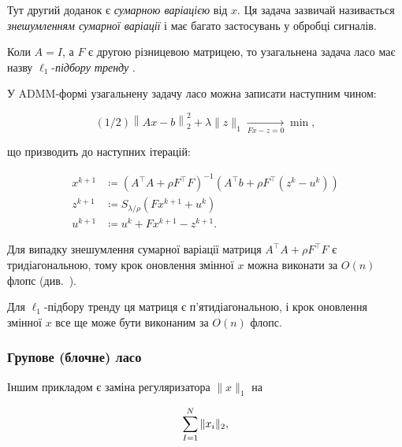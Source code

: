 \begin{definition}
    Тут другий доданок є \textit{сумарною варіацією} від $x$. Ця задача зазвичай називається \textit{знешумленням сумарної варіації} \cite{145} і має багато застосувань у обробці сигналів. 
\end{definition}

\begin{definition}
    Коли $A = I$, а $F$ є другою різницевою матрицею, то узагальнена задача ласо має назву $\ell_1$-\textit{підбору тренду} \cite{101}.
\end{definition}

У ADMM-формі узагальнену задачу ласо можна записати наступним чином:

\begin{equation}
    (1/2) \left\| A x - b \right\|_2^2 + \lambda \|z\|_1 \xrightarrow[F x - z = 0]{} \min,
\end{equation}

що призводить до наступних ітерацій:

\begin{align}
    x^{k + 1} &\coloneqq \left( A^\intercal A + \rho F^\intercal F \right)^{-1} \left( A^\intercal b + \rho F^\intercal \left( z^k - u^k \right) \right) \\
    z^{k + 1} &\coloneqq S_{\lambda / \rho} \left( F x^{k + 1} + u^k \right) \\
    u^{k + 1} &\coloneqq u^k + F x^{k + 1} - z^{k + 1}.
\end{align}

\begin{example}
    Для випадку знешумлення сумарної варіації матриця $A^\intercal A + \rho F^\intercal F$ є тридіагональною, тому крок оновлення змінної $x$ можна виконати за $O(n)$ флопс (див.~\cite[\S4.3]{90}).
\end{example}

\begin{example}
    Для $\ell_1$-підбору тренду ця матриця є п'ятидіагональною, і крок оновлення змінної $x$ все ще може бути виконаним за $O(n)$ флопс.
\end{example}

\subsubsection{Групове (блочне) ласо}

Іншим прикладом є заміна регуляризатора $\|x\|_1$ на 

\begin{equation}
    \operatorname*{\sum}_{I = 1}^N \|x_i\|_2,
\end{equation}

